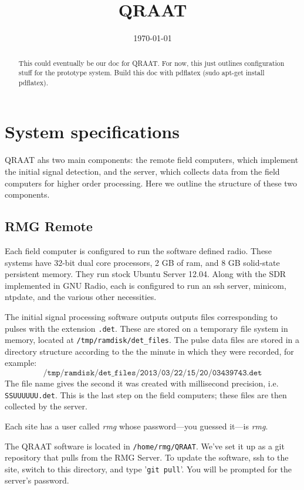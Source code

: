 \documentclass[letter]{article}
\author{}
\date{\today}
\title{QRAAT}
\begin{document}
\maketitle

\begin{abstract}
This could eventually be our doc for QRAAT. For now, this just outlines configuration 
stuff for the prototype system. Build this doc with pdflatex (sudo apt-get install pdflatex). 
\end{abstract}

\tableofcontents

\section{System specifications}
QRAAT ahs two main components: the remote field computers, which implement the initial 
signal detection, and the server, which collects data from the field computers for 
higher order processing. Here we outline the structure of these two components. 

\subsection{RMG Remote}
Each field computer is configured to run the software defined radio. These systems have 
32-bit dual core processors, 2 GB of ram, and 8 GB solid-state persistent memory. They 
run stock Ubuntu Server 12.04. Along with the SDR implemented in GNU Radio, each is 
configured to run an ssh server, minicom, ntpdate, and the various other necessities. 

The initial signal processing software outputs outputs files corresponding to pulses 
with the extension \texttt{.det}. These are stored on a temporary file system in memory, 
located at \texttt{/tmp/ramdisk/det\_files}. The pulse data files are stored in a directory 
structure according to the the minute in which they were recorded, for example: 
$$ \texttt{/tmp/ramdisk/det\_files/2013/03/22/15/20/03439743.det} $$
The file name gives the second it was created with millisecond precision, i.e. 
\texttt{SSUUUUUU.det}. This is the last step on the field computers; these files are 
then collected by the server. 

Each site has a user called \textit{rmg} whose password---you guessed it---is \textit{rmg}. 

The QRAAT software is located in \texttt{/home/rmg/QRAAT}. We've set it up as a git 
repository that pulls from the RMG Server. To update the software, ssh to the site, 
switch to this directory, and type '\texttt{git pull}'. You will be prompted for 
the server's password.  
\end{document}
